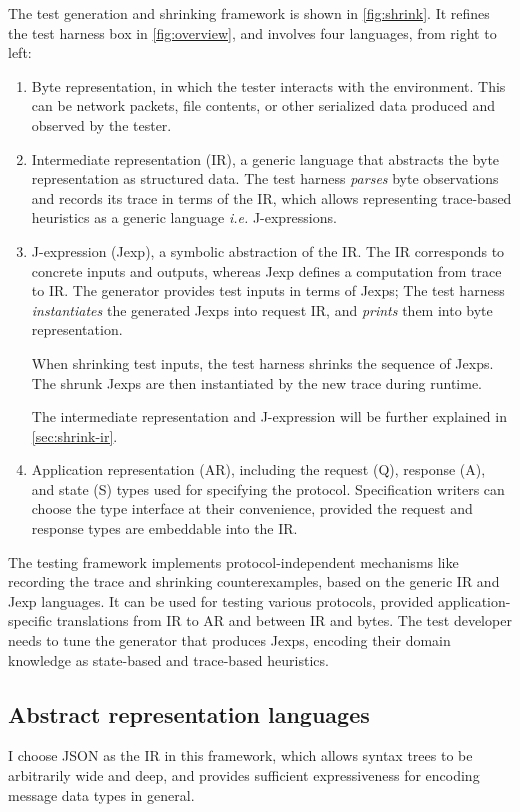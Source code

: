 The test generation and shrinking framework is shown in \autoref{fig:shrink}.
It refines the test harness box in \autoref{fig:overview}, and involves four
languages, from right to left:
\begin{enumerate}
  \item Byte representation, in which the tester interacts with the environment.
    This can be network packets, file contents, or other serialized data
    produced and observed by the tester.
  \item Intermediate representation (IR), a generic language that abstracts the
    byte representation as structured data.  The test harness {\em parses} byte
    observations and records its trace in terms of the IR, which allows
    representing trace-based heuristics as a generic language {\it i.e.}
    J-expressions.
  \item J-expression (Jexp), a symbolic abstraction of the IR.  The IR
    corresponds to concrete inputs and outputs, whereas Jexp defines a
    computation from trace to IR.  The generator provides test inputs in terms
    of Jexps; The test harness {\em instantiates} the generated Jexps into
    request IR, and {\em prints} them into byte representation.

    When shrinking test inputs, the test harness shrinks the sequence of Jexps.
    The shrunk Jexps are then instantiated by the new trace during runtime.

    The intermediate representation and J-expression will be further explained
    in \autoref{sec:shrink-ir}.
  \item Application representation (AR), including the request (\ilc Q),
    response (\ilc A), and state (\ilc S) types used for specifying the
    protocol.  Specification writers can choose the type interface at their
    convenience, provided the request and response types are embeddable into the
    IR.
\end{enumerate}

The testing framework implements protocol-independent mechanisms like recording
the trace and shrinking counterexamples, based on the generic IR and Jexp
languages.  It can be used for testing various protocols, provided
application-specific translations from IR to AR and between IR and bytes.  The
test developer needs to tune the generator that produces Jexps, encoding their
domain knowledge as state-based and trace-based heuristics.

\subsection{Abstract representation languages}
\label{sec:shrink-ir}
I choose JSON as the IR in this framework, which allows syntax trees to be
arbitrarily wide and deep, and provides sufficient expressiveness for encoding
message data types in general.

